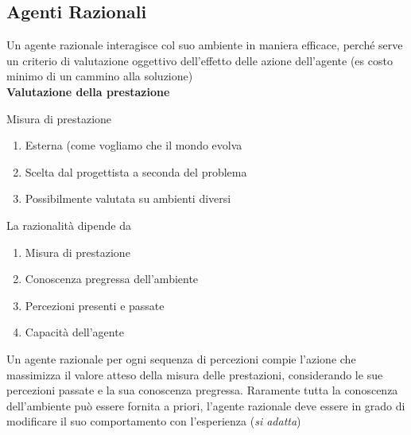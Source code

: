 \documentclass{article}
\begin{document}
\subsection{Agenti Razionali}
Un agente razionale interagisce col suo ambiente in maniera efficace, perché serve un criterio di valutazione oggettivo dell'effetto delle azione dell'agente (es costo minimo di un cammino alla soluzione)
\\


\textbf{Valutazione della prestazione}

Misura di prestazione
\begin{enumerate}
    \item Esterna (come vogliamo che il mondo evolva
    \item Scelta dal progettista a seconda del problema
    \item Possibilmente valutata su ambienti diversi
\end{enumerate}
La razionalità dipende da
\begin{enumerate}
    \item Misura di prestazione
    \item Conoscenza pregressa dell'ambiente
    \item Percezioni presenti e passate
    \item Capacità dell'agente
\end{enumerate}
Un agente razionale per ogni sequenza di percezioni compie l'azione che massimizza il valore atteso della misura delle prestazioni, considerando le sue percezioni passate e la sua conoscenza pregressa.
Raramente tutta la conoscenza dell'ambiente può essere fornita a priori, l'agente razionale deve essere in grado di modificare il suo comportamento con l'esperienza (\textit{si adatta})
\end{document}
